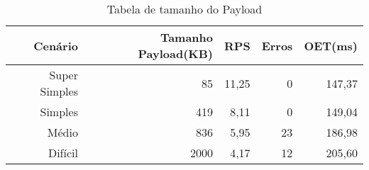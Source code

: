 \begin{table}[!htb]
    \centering
    \caption[Resultado \textit{payload}]{Tabela de tamanho do Payload 
    \label{tab:result-payload}}
    \begin{tabular}{rrrrr}
        \toprule
            Cenário & Tamanho Payload(KB) & RPS & Erros & OET(ms) \\ 
        \midrule
            Super Simples & 85 & 11,25 & 0 & 147,37 \\
            Simples & 419 & 8,11 & 0 & 149,04 \\
            Médio & 836 & 5,95 & 23 & 186,98 \\
            Difícil & 2000 & 4,17 & 12 & 205,60 \\
        \bottomrule
    \end{tabular}
\end{table}